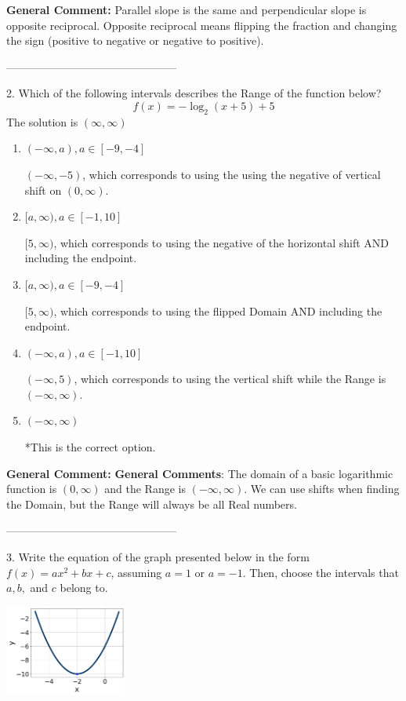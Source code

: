 \documentclass{extbook}[14pt]
\begin{document}
\textbf{General Comment:} Parallel slope is the same and perpendicular slope is opposite reciprocal. Opposite reciprocal means flipping the fraction and changing the sign (positive to negative or negative to positive). 

-----------------------------------------------

2. Which of the following intervals describes the Range of the function below?
\[ f(x) = -\log_2{(x+5)}+5 \] 
The solution is $ (\infty, \infty) $ 

\begin{enumerate}[label=\Alph*.] 
\item $ (-\infty, a), a \in [-9, -4] $ 

 $(-\infty, -5)$, which corresponds to using the using the negative of vertical shift on $(0, \infty)$. 
\item $ [a, \infty), a \in [-1, 10] $ 

 $[5, \infty)$, which corresponds to using the negative of the horizontal shift AND including the endpoint. 
\item $ [a, \infty), a \in [-9, -4] $ 

 $[5, \infty)$, which corresponds to using the flipped Domain AND including the endpoint. 
\item $ (-\infty, a), a \in [-1, 10] $ 

 $(-\infty, 5)$, which corresponds to using the vertical shift while the Range is $(-\infty, \infty)$. 
\item $ (-\infty, \infty) $ 

 *This is the correct option. 
\end{enumerate} 
 
\textbf{General Comment:} \textbf{General Comments}: The domain of a basic logarithmic function is $(0, \infty)$ and the Range is $(-\infty, \infty)$. We can use shifts when finding the Domain, but the Range will always be all Real numbers. 

-----------------------------------------------

3. Write the equation of the graph presented below in the form $f(x)=ax^2+bx+c$, assuming  $a=1$ or $a=-1$. Then, choose the intervals that $a, b,$ and $c$ belong to.
\begin{center} \includegraphics[width=0.3\textwidth]{../Figures/quadraticGraphToEquationB.png} \end{center} 
\end{document}
